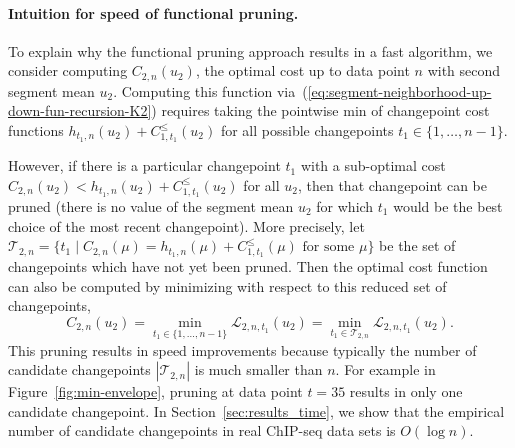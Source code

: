 \documentclass[twoside,11pt]{article}
\begin{document}
\paragraph{Intuition for speed of functional pruning.} To explain why
the functional pruning approach results in a fast algorithm, we
consider computing $C_{2,n}(u_2)$, the optimal cost up to data point
$n$ with second segment mean $u_2$. Computing this function
via~(\ref{eq:segment-neighborhood-up-down-fun-recursion-K2}) requires
taking the pointwise min of changepoint cost functions
$h_{t_1,n}(u_2)+C_{1,t_1}^\leq(u_2)$ for all possible changepoints
$t_1\in\{1,\dots,n-1\}$.

However, if there is a particular changepoint $t_1$ with a sub-optimal cost $C_{2,n}(u_2)<h_{t_1,n}(u_2)+C_{1,t_1}^\leq(u_2)$ for all $u_2$,
then that changepoint can be pruned (there is no value of the segment
mean $u_2$ for which $t_1$ would be the best choice of the most
recent changepoint). More precisely, let
$\mathcal T_{2,n}=\{ t_1\mid C_{2,n}(\mu)=h_{t_1,n}(\mu)+C_{1,t_1}^\leq(\mu)
\text{ for some $\mu$} \}$ be the set of changepoints which have not
yet been pruned.  Then the optimal cost function can also be computed
by minimizing with respect to this reduced set of changepoints,
\begin{equation}
  C_{2,n}(u_2) = 
\min_{t_1\in\{1,\dots,n-1\}}
\mathcal L_{2,n,t_1}(u_2)
=
\min_{t_1\in\mathcal T_{2,n}}
\mathcal L_{2,n,t_1}(u_2).
\end{equation}
This pruning results in speed improvements because typically the
number of candidate changepoints $|\mathcal T_{2,n}|$ is much smaller
than $n$. For example in Figure~\ref{fig:min-envelope}, pruning at
data point $t=35$ results in only one candidate changepoint. In
Section~\ref{sec:results_time}, we show that the empirical number of
candidate changepoints in real ChIP-seq data sets is $O(\log n)$.
\end{document}
